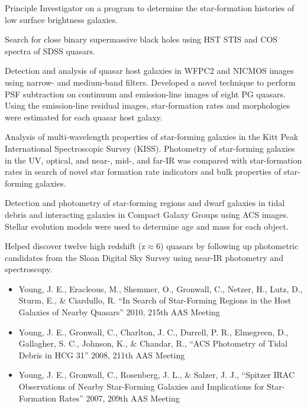 \begin{small}
\pagebreak
{}


{Principle Investigator on a program to determine the star-formation histories of low surface brightness galaxies.}

{Search for close binary supermassive black holes using HST STIS and COS spectra of SDSS quasars.}

{Detection and analysis of quasar host galaxies in WFPC2 and NICMOS images using narrow- and medium-band filters. Developed a novel technique to perform PSF subtraction on continuum and emission-line images of eight PG quasars. Using the emission-line residual images, star-formation rates and morphologies were estimated for each quasar host galaxy.}

{Analysis of multi-wavelength properties of star-forming galaxies in the Kitt Peak International Spectroscopic Survey (KISS). Photometry of star-forming galaxies in the UV, optical, and near-, mid-, and far-IR was compared with star-formation rates in search of novel star formation rate indicators and bulk properties of star-forming galaxies.}

{Detection and photometry of star-forming regions and dwarf galaxies in tidal debris and interacting galaxies in Compact Galaxy Groups using ACS images. Stellar evolution models were used to determine age and mass for each object.}


{Helped discover twelve high redshift (z$\approx$6) quasars by following up photometric candidates from the Sloan Digital Sky Survey using near-IR photometry and spectroscopy.}

\begin{itemize}
\item Young, J. E., Eracleous, M., Shemmer, O., Gronwall, C., Netzer, H., Lutz, D., Sturm, E., \& Ciardullo, R. ``In Search of Star-Forming Regions in the Host Galaxies of Nearby Quasars'' 2010, 215th AAS Meeting
\item Young, J. E., Gronwall, C., Charlton, J. C., Durrell, P. R., Elmegreen, D., Gallagher, S. C., Johnson, K., \& Chandar, R., ``ACS Photometry of Tidal Debris in HCG 31'' 2008, 211th AAS Meeting
\item Young, J. E., Gronwall, C., Rosenberg, J. L., \& Salzer, J. J., ``Spitzer IRAC Observations of Nearby Star-Forming Galaxies and Implications for Star-Formation Rates'' 2007, 209th AAS Meeting
\end{itemize}


\end{small}
